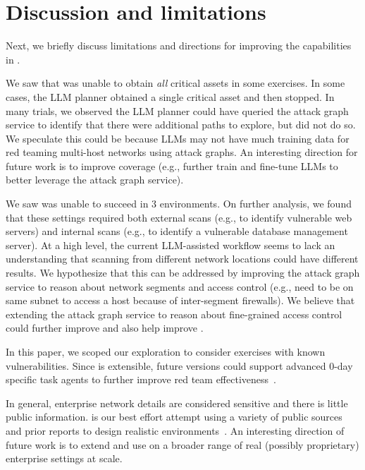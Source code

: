 \section{Discussion and limitations}
\label{sec:limitations}
Next, we briefly discuss limitations and directions for improving the capabilities in \sys.

 We saw that \sys was unable to obtain {\em  all} critical assets in some exercises.
 In some cases, the LLM planner  obtained a single critical asset and then stopped.
In many trials, we observed the  LLM planner  could have queried the \sys attack graph service to identify that there were additional paths to explore, but did not do so.
We speculate this could be because LLMs may not have much training data for red teaming multi-host networks  using attack graphs.
An interesting direction for future work is to improve coverage (e.g., further train and fine-tune LLMs to  better leverage the attack graph service).

We saw \sys was unable to succeed  in 3 environments.
 On further analysis, we found that these settings required both external scans (e.g., to identify vulnerable web servers) and internal scans (e.g., to identify a vulnerable database management server).
 At a high level, the current LLM-assisted workflow seems to lack an   understanding  that scanning from different network locations could have different results.
We hypothesize  that this can be addressed by improving  the
\sys  attack graph service   to reason about network  segments and access control (e.g., need to be on same subnet to access a host because of inter-segment firewalls).
We believe that extending the attack graph service to reason about fine-grained access control could further improve \acquisition and also   help improve \comprehensiveness.

In this paper, we scoped our exploration to    consider exercises with known vulnerabilities.
Since \sys is extensible, future versions could support advanced 0-day  specific task agents to further improve red team effectiveness~\cite{wang2025cybergym}.

In general,  enterprise network details are  considered sensitive  and there is little public information.
\benchmark is our best effort attempt using a variety of public sources and prior reports  to design realistic environments~\cite{equifax_report, colonial_pipeline_techtarget, ciscoEnterpriseNetwork, ferguson2021_deception_psychology}.
An interesting direction of future work is to extend \benchmark and use \sys on a broader range of real  (possibly proprietary) enterprise settings at scale.

